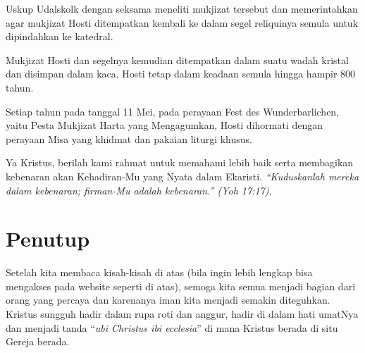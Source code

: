Uskup Udalskolk dengan seksama meneliti mukjizat tersebut dan memerintahkan agar mukjizat Hosti ditempatkan kembali ke dalam segel reliquinya semula untuk dipindahkan ke katedral.

Mukjizat Hosti dan segelnya kemudian ditempatkan dalam suatu wadah kristal dan disimpan dalam kaca. Hosti tetap dalam keadaan semula hingga hampir 800 tahun.

Setiap tahun pada tanggal 11 Mei, pada perayaan Fest des Wunderbarlichen, yaitu Pesta Mukjizat Harta yang Mengagumkan, Hosti dihormati dengan perayaan Misa yang khidmat dan pakaian liturgi khusus.   

Ya Kristus, berilah kami rahmat untuk memahami lebih baik serta membagikan kebenaran akan Kehadiran-Mu yang Nyata dalam Ekaristi. \textit{``Kuduskanlah mereka dalam kebenaran; firman-Mu adalah kebenaran.'' (Yoh 17:17)}.

\section*{Penutup}

Setelah kita membaca kisah-kisah di atas (bila ingin lebih lengkap bisa mengakses pada website seperti di atas), semoga kita semua menjadi bagian dari orang yang percaya dan karenanya iman kita menjadi semakin diteguhkan. Kristus sungguh hadir dalam rupa roti dan anggur, hadir di dalam hati umatNya dan menjadi tanda ``\textit{ubi Christus ibi ecclesia}'' di mana Kristus berada di situ Gereja berada.


\renewcommand{\thesection}{\Alph{section}}
